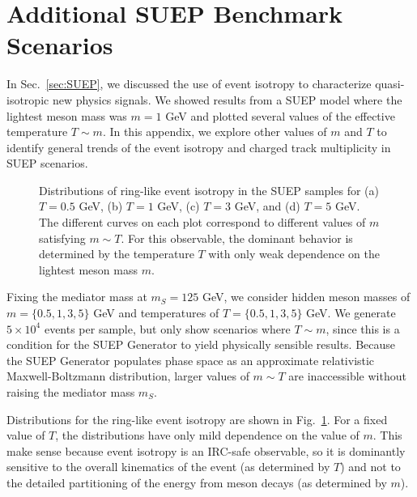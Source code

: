 \documentclass[letterpaper,11pt]{article}
\DeclareRobustCommand{\Sec}[1]{Sec.~\ref{#1}}
\DeclareRobustCommand{\Fig}[1]{Fig.~\ref{#1}}
\begin{document}
\section{Additional SUEP Benchmark Scenarios}
\label{app:suep}


In \Sec{sec:SUEP}, we discussed the use of event isotropy to characterize quasi-isotropic new physics signals.
%
We showed results from a SUEP model where the lightest meson mass was $m = 1$ GeV and plotted several values of the effective temperature $T \sim m$.
%
In this appendix, we explore other values of $m$ and $T$ to identify general trends of the event isotropy and charged track multiplicity in SUEP scenarios. 


\begin{figure}[t]
\centering
{}
     \hfill
{}
          \hfill
     \hfill
     \hfill
\caption{Distributions of ring-like event isotropy in the SUEP samples for (a) $T = 0.5$ GeV, (b) $T=1$ GeV, (c) $T=3$ GeV, and (d) $T=5$ GeV.
%
The different curves on each plot correspond to different values of $m$ satisfying $m\sim T$.
%
For this observable, the dominant behavior is determined by the temperature $T$ with only weak dependence on the lightest meson mass $m$.}
%
\label{fig:appsuepNoT_remd}
\end{figure} 


Fixing the mediator mass at $m_S = 125$ GeV, we consider hidden meson masses of $m = \{0.5, 1, 3, 5 \}$ GeV and temperatures of $T = \{0.5, 1, 3, 5\}$ GeV.
%
We generate $5\times 10^4$ events per sample, but only show scenarios where $T \sim m$, since this is a condition for the SUEP Generator to yield physically sensible results.
%
Because the SUEP Generator populates phase space as an approximate relativistic Maxwell-Boltzmann distribution, larger values of $m  \sim T$ are inaccessible without raising the mediator mass $m_S$.

 
Distributions for the ring-like event isotropy are shown in \Fig{fig:appsuepNoT_remd}.
For a fixed value of $T$, the distributions have only mild dependence on the value of $m$.
%
This make sense because event isotropy is an IRC-safe observable, so it is dominantly sensitive to the overall kinematics of the event (as determined by $T$) and not to the detailed partitioning of the energy from meson decays (as determined by $m$).
\end{document}
